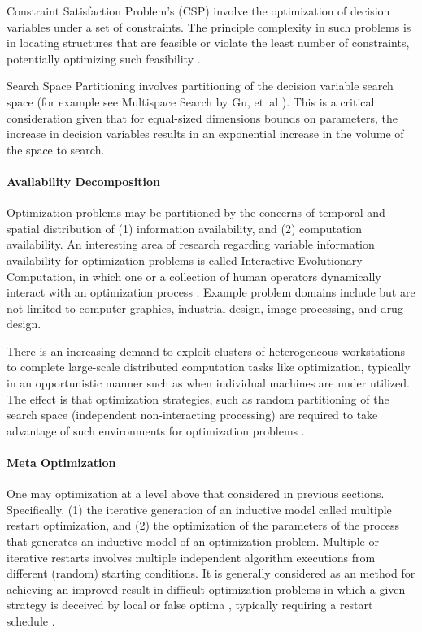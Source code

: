 Constraint Satisfaction Problem's (CSP) involve the optimization of decision variables under a set of constraints. The principle complexity in such problems is in locating structures that are feasible or violate the least number of constraints, potentially optimizing such feasibility \cite{Tsang1993, Kumar1992}. 

Search Space Partitioning involves partitioning of the decision variable search space (for example see Multispace Search by Gu, et~al \cite{Du1997, Gu1997, Gu1994}). This is a critical consideration given that for equal-sized dimensions bounds on parameters, the increase in decision variables results in an exponential increase in the volume of the space to search.
			
\paragraph{Availability Decomposition}
Optimization problems may be partitioned by the concerns of temporal and spatial distribution of (1) information availability, and (2) computation availability. An interesting area of research regarding variable information availability for optimization problems is called Interactive Evolutionary Computation, in which one or a collection of human operators dynamically interact with an optimization process \cite{Takagi2001}. Example problem domains include but are not limited to computer graphics, industrial design, image processing, and drug design. 

There is an increasing demand to exploit clusters of heterogeneous workstations to complete large-scale distributed computation tasks like optimization, typically in an opportunistic manner such as when individual machines are under utilized. The effect is that optimization strategies, such as random partitioning of the search space (independent non-interacting processing) are required to take advantage of such environments for optimization problems \cite{Schnekenburger1993, Liu2000}.
	
\paragraph{Meta Optimization}
One may optimization at a level above that considered in previous sections. Specifically, (1) the iterative generation of an inductive model called multiple restart optimization, and (2) the optimization of the parameters of the process that generates an inductive model of an optimization problem. Multiple or iterative restarts involves multiple independent algorithm executions from different (random) starting conditions. It is generally considered as an method for achieving an improved result in difficult optimization problems in which a given strategy is deceived by local or false optima \cite{Muselli1997, Hu1994}, typically requiring a restart schedule \cite{Fukunaga1998}. 

